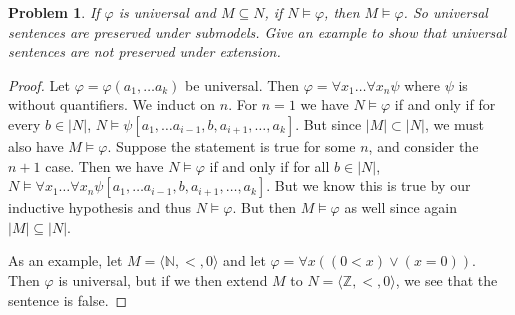\documentclass{article}
\newtheorem{problem}{Problem}
\begin{document}
\begin{problem}
If $\varphi$ is universal and $M \subseteq N$, if $N \models \varphi$, then $M \models \varphi$. So universal sentences are preserved under submodels. Give an example to show that universal sentences are not preserved under extension.
\end{problem}
\begin{proof}
Let $\varphi = \varphi(a_1, \dots a_k)$ be universal. Then $\varphi = \forall x_1 \dots \forall x_n \psi$ where $\psi$ is without quantifiers. We induct on $n$. For $n=1$ we have $N \models \varphi$ if and only if for every $b \in |N|$, $N \models \psi[a_1, \dots a_{i-1}, b, a_{i+1}, \dots , a_k]$. But since $|M| \subset |N|$, we must also have $M \models \varphi$. Suppose the statement is true for some $n$, and consider the $n+1$ case. Then we have $N \models \varphi$ if and only if for all $b \in |N|$, $N \models \forall x_1 \dots \forall x_n \psi[a_1, \dots a_{i-1}, b, a_{i+1}, \dots , a_k]$. But we know this is true by our inductive hypothesis and thus $N \models \varphi$. But then $M \models \varphi$ as well since again $|M| \subseteq |N|$.

As an example, let $M = \langle \mathbb{N}, < , 0\rangle$ and let $\varphi = \forall x ((0 < x) \vee (x = 0))$. Then $\varphi$ is universal, but if we then extend $M$ to $N = \langle \mathbb{Z}, < , 0 \rangle$, we see that the sentence is false.
\end{proof}
\end{document}
